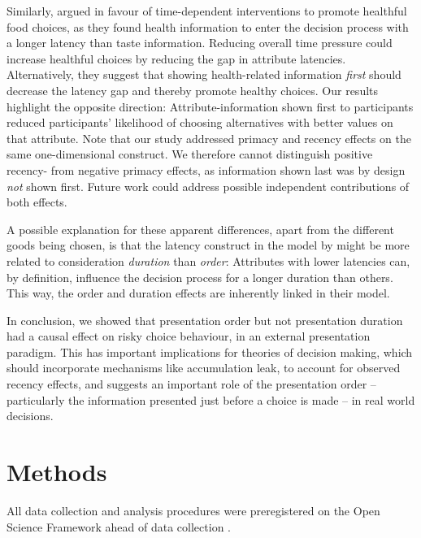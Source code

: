 \documentclass[11pt, a4paper, twocolumn, abstract]{scrartcl}
\begin{document}
Similarly, \textcite{sullivan2021HealthfulChoicesDependa} argued in favour of time-dependent interventions to promote healthful food choices, as they found health information to enter the decision process with a longer latency than taste information. Reducing overall time pressure could increase healthful choices by reducing the gap in attribute latencies. Alternatively, they suggest that showing health-related information \emph{first} should decrease the latency gap and thereby promote healthy choices. Our results highlight the opposite direction: Attribute-information shown first to participants reduced participants' likelihood of choosing alternatives with better values on that attribute. Note that our study addressed primacy and recency effects on the same one-dimensional construct. We therefore cannot distinguish positive recency- from negative primacy effects, as information shown last was by design \emph{not} shown first. Future work could address possible independent contributions of both effects.

A possible explanation for these apparent differences, apart from the different goods being chosen, is that the latency construct in the model by \textcite{sullivan2021HealthfulChoicesDependa} might be more related to consideration \emph{duration} than \emph{order}: Attributes with lower latencies can, by definition, influence the decision process for a longer duration than others. This way, the order and duration effects are inherently linked in their model.


In conclusion, we showed that presentation order but not presentation duration had a causal effect on risky choice behaviour, in an external presentation paradigm. This has important implications for theories of decision making, which should incorporate mechanisms like accumulation leak, to account for observed recency effects, and suggests an important role of the presentation order – particularly the information presented just before a choice is made – in real world decisions.

\section*{Methods}
\label{sec:methods}

All data collection and analysis procedures were preregistered on the Open Science Framework ahead of data collection \parencite{molter2021InvestigatingCausalEffects}.
\end{document}
